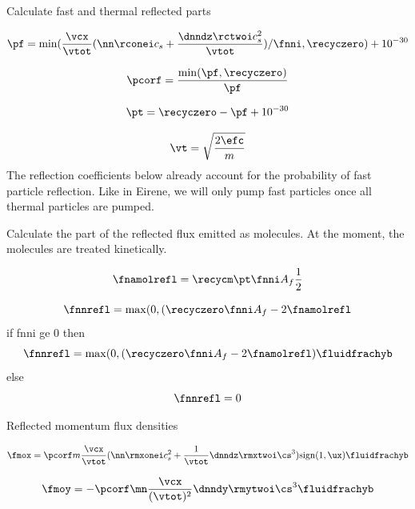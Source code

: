 Calculate fast and thermal reflected parts

\begin{equation}
    \pf = \mathrm{min}( \frac{\vcx}{\vtot} ( \nn \rconei c_s + \frac{\dnndz \rctwoi c_s^2}{\vtot}) / \fnni, \recyczero) + 10^{-30}
\end{equation}

\begin{equation}
    \pcorf = \frac{\mathrm{min}(\pf, \recyczero)}{\pf}
\end{equation}

\begin{equation}
    \pt = \recyczero - \pf + 10^{-30}
\end{equation}

\begin{equation}
    \vt = \sqrt{\frac{2 \efc }{m}}
\end{equation}
The reflection coefficients below already account for the probability of fast particle reflection. Like in Eirene, we will only pump fast particles once all thermal particles are pumped.

Calculate the part of the reflected flux emitted as molecules. At the moment, the molecules are treated kinetically.

\begin{equation}
    \fnamolrefl = \recycm \pt \fnni A_f \frac{1}{2}
\end{equation}

\begin{equation}
    \fnnrefl = \mathrm{max}(0,(\recyczero \fnni A_f - 2 \fnamolrefl
\end{equation}
if fnni ge 0 then
\begin{equation}
    \fnnrefl = \mathrm{max}(0,(\recyczero \fnni A_f- 2 \fnamolrefl) \fluidfrachyb
\end{equation}
else
\begin{equation}
    \fnnrefl = 0
\end{equation}

Reflected momentum flux densities

\begin{equation}
    \fmox = \pcorf m \frac{\vcx}{\vtot} (\nn \rmxonei c_s^2 + \frac{1}{\vtot} \dnndz \rmxtwoi \cs^3) \mathrm{sign}(1,\ux) \fluidfrachyb
\end{equation}

\begin{equation}
    \fmoy = -\pcorf  \mn \frac{\vcx}{(\vtot)^2} \dnndy \rmytwoi \cs^3 \fluidfrachyb
\end{equation}

